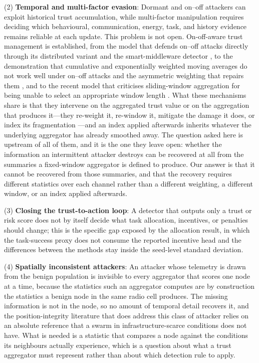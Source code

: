 \documentclass[notspecified,article,submit,moreauthors]{Definitions/mdpi}
\begin{document}
(2) \textbf{Temporal and multi-factor evasion}: Dormant and on--off attackers can exploit historical trust accumulation, while multi-factor manipulation requires deciding which behavioural, communication, energy, task, and history evidence remains reliable at each update. This problem is not open. On-off-aware trust management is established, from the model that defends on--off attacks directly \cite{chae2014onoff} through its distributed variant \cite{mendoza2015onoff} and the smart-middleware detector \cite{caminha2018onoff}, to the demonstration that cumulative and exponentially weighted moving averages do not work well under on--off attacks and the asymmetric weighting that repairs them \cite{salimitari2020prospect}, and to the recent model that criticises sliding-window aggregation for being unable to select an appropriate window length \cite{ziauddin2026recfilter}. What these mechanisms share is that they intervene on the aggregated trust value or on the aggregation that produces it---they re-weight it, re-window it, mitigate the damage it does, or index its fragmentation \cite{kannan2023onoff}---and an index applied afterwards inherits whatever the underlying aggregator has already smoothed away. The question asked here is upstream of all of them, and it is the one they leave open: whether the information an intermittent attacker destroys can be recovered at all from the summaries a fixed-window aggregator is defined to produce. Our answer is that it cannot be recovered from those summaries, and that the recovery requires different statistics over each channel rather than a different weighting, a different window, or an index applied afterwards.

(3) \textbf{Closing the trust-to-action loop}: A detector that outputs only a trust or risk score does not by itself decide what task allocation, incentives, or penalties should change; this is the specific gap exposed by the allocation result, in which the task-success proxy does not consume the reported incentive head and the differences between the methods stay inside the seed-level standard deviation.

(4) \textbf{Spatially inconsistent attackers}: An attacker whose telemetry is drawn from the benign population is invisible to every aggregator that scores one node at a time, because the statistics such an aggregator computes are by construction the statistics a benign node in the same radio cell produces. The missing information is not in the node, so no amount of temporal detail recovers it, and the position-integrity literature that does address this class of attacker relies on an absolute reference that a swarm in infrastructure-scarce conditions does not have. What is needed is a statistic that compares a node against the conditions its neighbours actually experience, which is a question about what a trust aggregator must represent rather than about which detection rule to apply.
\end{document}
